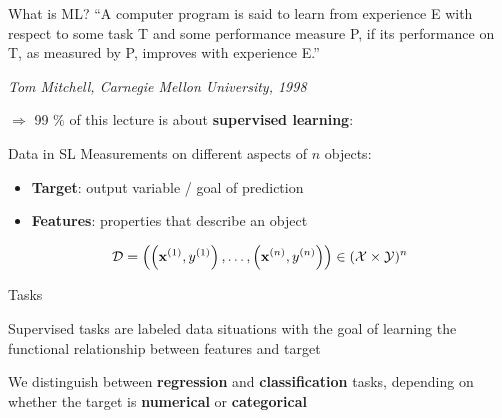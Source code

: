 \documentclass[11pt,compress,t,notes=noshow, xcolor=table]{beamer}
\begin{document}


\begin{framev}{What is ML?}
``A computer program is said to learn from experience E with respect to some task T and some performance measure P, if its performance on T, as measured by P, improves with experience E.''\\
\begin{footnotesize}
\emph{Tom Mitchell, Carnegie Mellon University, 1998}\\
\end{footnotesize}
\vfill
$\Rightarrow$ 99 $\%$ of this lecture is about \textbf{supervised learning}:
\vfill
{}
\end{framev}


\begin{framev}{Data in SL}
Measurements on different aspects of $n$ objects:
\spacer
\begin{itemize}
  \item \textbf{Target}: output variable / goal of prediction
  \item \textbf{Features}: properties that describe an object 
\end{itemize}
\vfill
{}
\vfill
$$
\mathcal{D} = \left( \left(\mathbf{x}^{(1)}, y^{(1)}\right), \ldots, \left(\mathbf{x}^{(n)}, y^{(n)}\right)\right) \in (\mathcal{X} \times \mathcal{Y})^n
$$
\end{framev}


\begin{framei}{Tasks}
\item Supervised tasks are labeled data situations with the goal of learning the functional relationship between features and target
\item We distinguish between \textbf{regression} and \textbf{classification} tasks, depending on whether the target is \textbf{numerical} or \textbf{categorical}
\vfill
{}
\end{framei}
\end{document}

